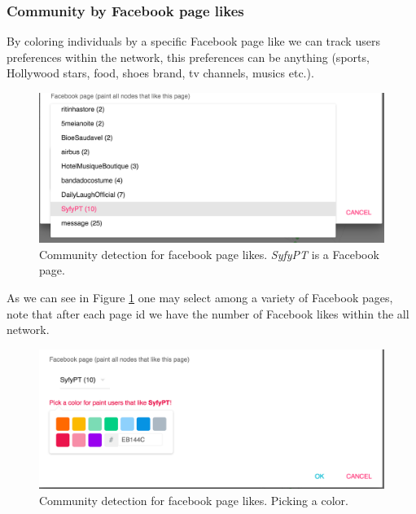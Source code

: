 \subsubsection*{Community by Facebook page likes}

By coloring individuals by a specific Facebook page like we can track users preferences within the network, this preferences can be anything (sports, Hollywood stars, food, shoes brand, tv channels, musics etc.).

\begin{figure}[h!]
\begin{center}
  \hspace*{-0.8in}
  \includegraphics[width=1.2\textwidth]{img/socii/socii_9.png}
\end{center}
\caption{\label{img:socii_10} Community detection for facebook page likes. \textit{SyfyPT} is a Facebook page.}
\end{figure}

As we can see in Figure \ref{img:socii_10} one may select among a variety of Facebook pages, note that after each page id we have the number of Facebook likes within the all network.

\begin{figure}[h!]
\begin{center}
  \hspace*{-0.8in}
  \includegraphics[width=1.2\textwidth]{img/socii/socii_10.png}
\end{center}
\caption{\label{img:socii_11} Community detection for facebook page likes. Picking a color.}
\end{figure}

